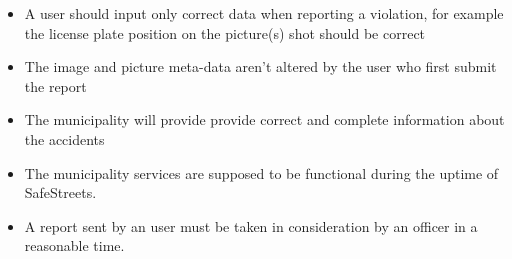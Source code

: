 \begin{itemize}

\item A user should input only correct data when reporting a violation, for example the license plate position on the picture(s) shot should be correct

\item The image and picture meta-data aren't altered by the user who first submit the report

\item The municipality will provide provide correct and complete information 
about the accidents

\item The municipality services are supposed to be functional during the uptime of SafeStreets.
\item A report sent by an user must be taken in consideration by an officer in a reasonable time.

\end{itemize}